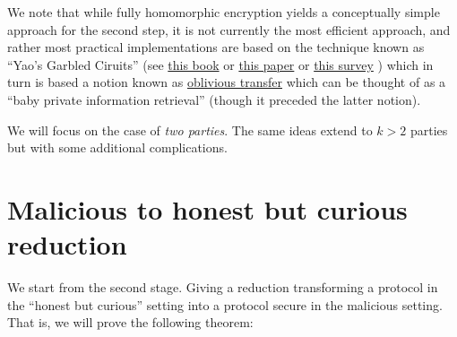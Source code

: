 We note that while fully homomorphic encryption yields a conceptually
simple approach for the second step, it is not currently the most
efficient approach, and rather most practical implementations are based
on the technique known as ``Yao's Garbled Ciruits'' (see
\href{http://u.cs.biu.ac.il/~lindell/efficient-protocols.html}{this
book} or \href{https://eprint.iacr.org/2004/175.pdf}{this paper} or
\href{https://www.cs.uic.edu/pub/Bits/PeterSnyder/Peter_Snyder_-_Garbled_Circuits_WCP_2_column.pdf}{this
survey} ) which in turn is based a notion known as
\href{https://en.wikipedia.org/wiki/Oblivious_transfer}{oblivious
transfer} which can be thought of as a ``baby private information
retrieval'' (though it preceded the latter notion).

We will focus on the case of \emph{two parties}. The same ideas extend
to \(k>2\) parties but with some additional complications.

\section{Malicious to honest but curious reduction}\label{hbctomalred}

We start from the second stage. Giving a reduction transforming a
protocol in the ``honest but curious'' setting into a protocol secure in
the malicious setting. That is, we will prove the following theorem:

\hypertarget{hbctomalthm}{}


